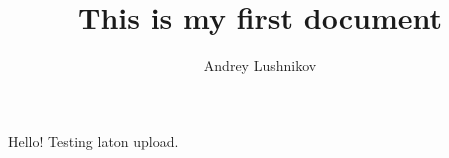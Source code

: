 \documentclass{article}
\title{This is my first document}
\author{Andrey Lushnikov}
\begin{document}
\maketitle
Hello! Testing laton upload.
\end{document}
